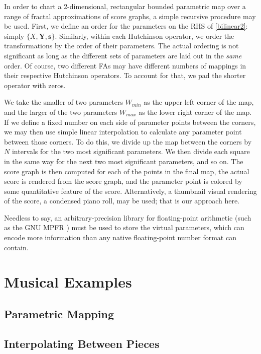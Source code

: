 \documentclass[english,11pt,letterpaper,onecolumn]{scrartcl}
\numberwithin{equation}{section}
\begin{document}
In order to chart a 2-dimensional, rectangular bounded parametric map over a
range of fractal approximations of score graphs, a simple recursive procedure
may be used. First, we define an order for the parameters on the RHS of
\eqref{bilinear2}: simply $\{X, \mathbf{Y}, \mathbf{s}\}$. Similarly, within
each Hutchinson operator, we order the transformations by the order of their
parameters. The actual ordering is not significant as long as the different sets
of parameters are laid out in the \textit{same} order. Of course, two different
FAs may have different numbers of mappings in their respective Hutchinson
operators. To account for that, we pad the shorter operator with zeros.

We take the smaller of two parameters $W_{min}$ as the upper left corner of the
map, and the larger of the two parameters $W_{max}$ as the lower right corner of
the map. If we define a fixed number on each side of parameter points between
the corners, we may then use simple linear interpolation to calculate any
parameter point between those corners. To do this, we divide up the map between
the corners by $N$ intervals for the two most significant parameters. We then
divide each square in the same way for the next two most significant parameters,
and so on. The score graph is then computed for each of the points in the final
map, the actual score is rendered from the score graph, and the parameter point
is colored by some quantitative feature of the score. Alternatively, a thumbnail
visual rendering of the score, a condensed piano roll, may be used; that is our
approach here.

Needless to say, an arbitrary-precision library for floating-point arithmetic
(such as the GNU MPFR \cite{Fousse:2007:MMB:1236463.1236468}) must be used to
store the virtual parameters, which can encode more information than any native
floating-point number format can contain.

\section{Musical Examples}

\subsection{Parametric Mapping}

\subsection{Interpolating Between Pieces}
\end{document}
